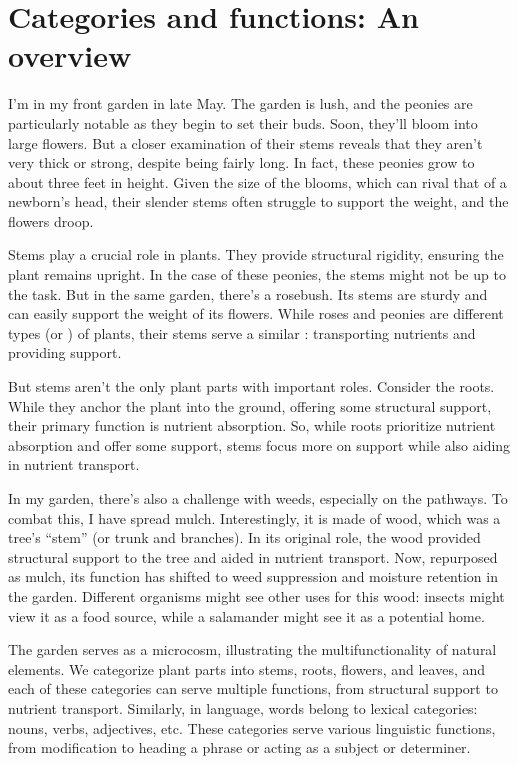 \section{Categories and functions: An overview}
\label{sec:cat-funct}

I'm in my front garden in late May. The garden is lush, and the peonies are particularly notable as they begin to set their buds. Soon, they'll bloom into large flowers. But a closer examination of their stems reveals that they aren't very thick or strong, despite being fairly long. In fact, these peonies grow to about three feet in height. Given the size of the blooms, which can rival that of a newborn's head, their slender stems often struggle to support the weight, and the flowers droop.

Stems play a crucial role in plants. They provide structural rigidity, ensuring the plant remains upright. In the case of these peonies, the stems might not be up to the task. But in the same garden, there's a rosebush. Its stems are sturdy and can easily support the weight of its flowers. While roses and peonies are different types (or ) of plants, their stems serve a similar : transporting nutrients and providing support.

But stems aren't the only plant parts with important roles. Consider the roots. While they anchor the plant into the ground, offering some structural support, their primary function is nutrient absorption. So, while roots prioritize nutrient absorption and offer some support, stems focus more on support while also aiding in nutrient transport.

In my garden, there's also a challenge with weeds, especially on the pathways. To combat this, I have spread mulch. Interestingly, it is made of wood, which was a tree's \enquote{stem} (or trunk and branches). In its original role, the wood provided structural support to the tree and aided in nutrient transport. Now, repurposed as mulch, its function has shifted to weed suppression and moisture retention in the garden. Different organisms might see other uses for this wood: insects might view it as a food source, while a salamander might see it as a potential home.

The garden serves as a microcosm, illustrating the multifunctionality of natural elements. We categorize plant parts into stems, roots, flowers, and leaves, and each of these categories can serve multiple functions, from structural support to nutrient transport. Similarly, in language, words belong to lexical categories: nouns, verbs, adjectives, etc. These categories serve various linguistic functions, from modification to heading a phrase or acting as a subject or determiner.

